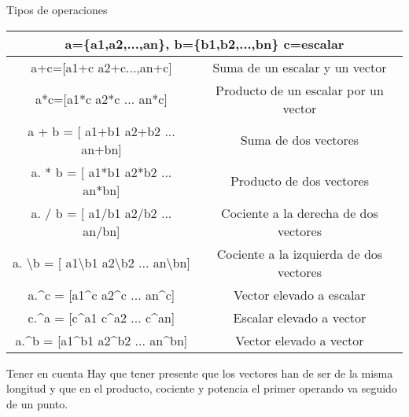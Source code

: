 \documentclass{bredelebeamer}
\begin{document}
\begin{frame}{Tipos de operaciones}
\begin{table}[]
\centering
\begin{tabular}{|c|c|}
\hline
\multicolumn{2}{|c|}{a=\{a1,a2,...,an\}, b=\{b1,b2,...,bn\} c=escalar}                                                                           \\ \hline
a+c={[}a1+c a2+c...,an+c{]}                                                                            & Suma de un escalar y un vector          \\ \hline
a*c={[}a1*c a2*c ... an*c{]}                                                                           & Producto de un escalar por un vector    \\ \hline
a + b = {[} a1+b1 a2+b2 ... an+bn{]}                                                                   & Suma de dos vectores                    \\ \hline
a. * b = {[} a1*b1 a2*b2 ... an*bn{]}                                                                  & Producto de dos vectores                \\ \hline
a. / b = {[} a1/b1 a2/b2 ... an/bn{]}                                                                  & Cociente a la derecha de dos vectores   \\ \hline
a. \textbackslash b = {[} a1\textbackslash{}b1 a2\textbackslash{}b2 ... an\textbackslash{}bn{]}        & Cociente a la izquierda de dos vectores \\ \hline
a.\textasciicircum{}c = {[}a1\textasciicircum{}c a2\textasciicircum{}c ... an\textasciicircum{}c{]}    & Vector elevado a escalar                \\ \hline
c.\textasciicircum{}a = {[}c\textasciicircum{}a1 c\textasciicircum{}a2 ... c\textasciicircum{}an{]}    & Escalar elevado a vector                \\ \hline
a.\textasciicircum{}b = {[}a1\textasciicircum{}b1 a2\textasciicircum{}b2 ... an\textasciicircum{}bn{]} & Vector elevado a vector                 \\ \hline
\end{tabular}
\end{table}
\begin{alertblock}{Tener en cuenta}
Hay que tener presente que los vectores han de ser de la misma longitud y que en el producto, cociente y potencia el primer operando va seguido de un punto.
\end{alertblock}
\end{frame}
\end{document}
